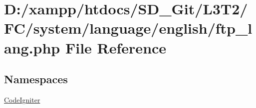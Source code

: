 \hypertarget{ftp__lang_8php}{}\section{D\+:/xampp/htdocs/\+S\+D\+\_\+\+Git/\+L3\+T2/\+F\+C/system/language/english/ftp\+\_\+lang.php File Reference}
\label{ftp__lang_8php}
\subsection*{Namespaces}
\begin{DoxyCompactItemize}
\item 
 \hyperlink{namespace_code_igniter}{Code\+Igniter}
\end{DoxyCompactItemize}
